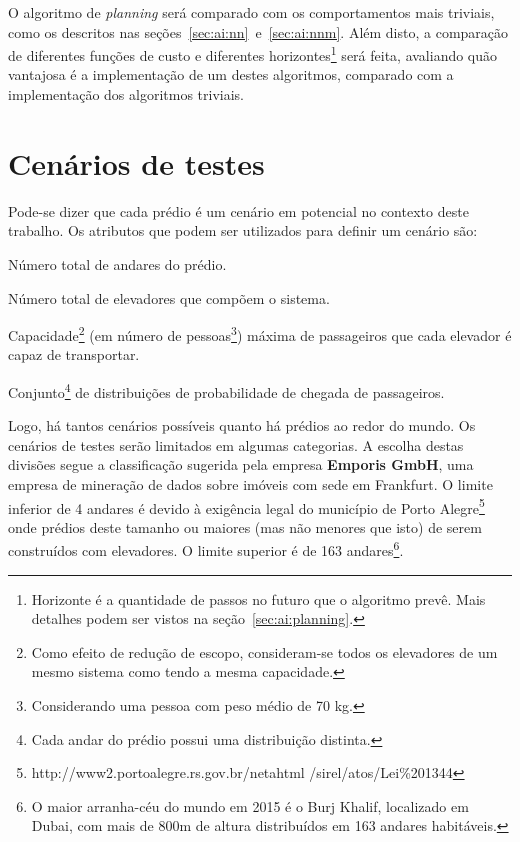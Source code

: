 O algoritmo de \textit{planning} será comparado com os comportamentos mais
triviais, como os descritos nas seções~\ref{sec:ai:nn}~e~\ref{sec:ai:nnm}. Além
disto, a comparação de diferentes funções de custo e diferentes
horizontes\footnote{Horizonte é a quantidade de passos no futuro que o algoritmo
prevê. Mais detalhes podem ser vistos na seção~\ref{sec:ai:planning}.} será
feita, avaliando quão vantajosa é a implementação de um destes algoritmos,
comparado com a implementação dos algoritmos triviais.

\section{\label{section:scenarios}Cenários de testes}

Pode-se dizer que cada prédio é um cenário em potencial no contexto deste
trabalho. Os atributos que podem ser utilizados para definir um cenário são:

\begin{description}[leftmargin=!,labelwidth=\widthof{\bfseries F}]
  \item[F]
  Número total de andares do prédio.
  \item[E]
  Número total de elevadores que compõem o sistema.
  \item[C]
  Capacidade\footnote{Como efeito de redução de escopo, consideram-se todos os
  elevadores de um mesmo sistema como tendo a mesma capacidade.} (em número de
  pessoas\footnote{Considerando uma pessoa com peso médio de 70 kg.}) máxima de
  passageiros que cada elevador é capaz de transportar.
  \item[D]
  Conjunto\footnote{Cada andar do prédio possui uma distribuição distinta.} de distribuições de probabilidade de chegada de passageiros.
\end{description}

Logo, há tantos cenários possíveis quanto há prédios ao redor do mundo. Os
cenários de testes serão limitados em algumas categorias. A escolha destas
divisões segue a classificação \cite{Emporis15} sugerida pela empresa
\textbf{Emporis GmbH}, uma empresa de mineração de dados sobre imóveis com sede
em Frankfurt. O limite inferior de 4 andares é devido à exigência legal do
município de Porto Alegre\footnote{http://www2.portoalegre.rs.gov.br/netahtml
/sirel/atos/Lei\%201344} onde prédios deste tamanho ou maiores (mas não menores
que isto) de serem construídos com elevadores. O limite superior é de 163
andares\footnote{O maior arranha-céu do mundo em 2015 é o Burj Khalif,
localizado em Dubai, com mais de 800m de altura distribuídos em 163 andares
habitáveis.}.

